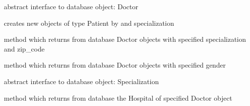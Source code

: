\documentclass[letterpaper,10pt,english]{sphinxmanual}
\begin{document}

\begin{fulllineitems}
\label{dao:doctors.dao.DoctorDAO}
abstract interface to database object: Doctor

\begin{fulllineitems}
\label{dao:doctors.dao.DoctorDAO.create}
creates new objects of type Patient by and specialization

\end{fulllineitems}


\begin{fulllineitems}
\label{dao:doctors.dao.DoctorDAO.getByCriteria}
method which returns from database Doctor objects with specified specialization and zip\_code

\end{fulllineitems}


\begin{fulllineitems}
\label{dao:doctors.dao.DoctorDAO.getByFilter}
method which returns from database Doctor objects with specified gender

\end{fulllineitems}


\end{fulllineitems}


\begin{fulllineitems}
\label{dao:doctors.dao.HospitalDAO}
abstract interface to database object: Specialization

\begin{fulllineitems}
\label{dao:doctors.dao.HospitalDAO.getByDoctor}
method which returns from database the Hospital of specified Doctor object

\end{fulllineitems}


\end{fulllineitems}
\end{document}
